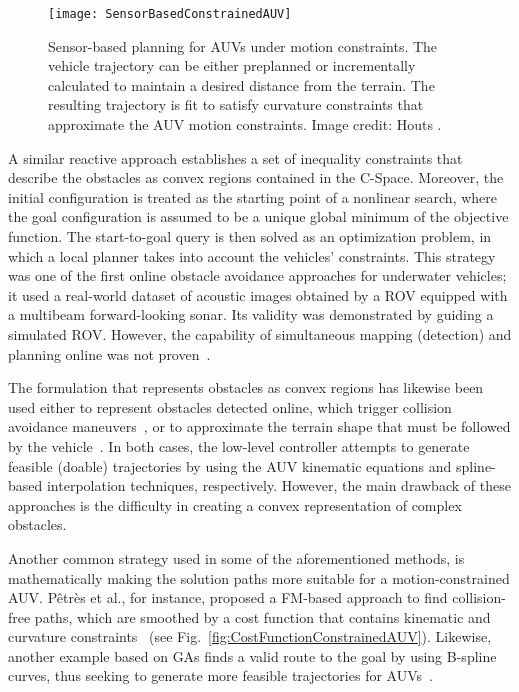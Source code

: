 \begin{figure}[htbp]
    \myfloatalign
    \texttt{[image: SensorBasedConstrainedAUV]}
\caption[Sensor-based planning for AUVs under motion constraints.]
{Sensor-based planning for AUVs under motion constraints. The vehicle trajectory
can be either preplanned or incrementally calculated to maintain a desired
distance from the terrain. The resulting trajectory is fit to satisfy
curvature constraints that approximate the AUV motion constraints. Image credit:
Houts \etal\cite{Houts2012,Houts2014}.}
\label{fig:SensorBasedConstrainedAUV}
\end{figure}

A similar reactive approach establishes a set of inequality constraints that
describe the obstacles as convex regions contained in the \ac{C-Space}.
Moreover, the initial configuration is treated as the starting point of a
nonlinear search, where the goal configuration is assumed to be a unique global
minimum of the objective function. The start-to-goal query is then solved as an
optimization problem, in which a local planner takes into account the vehicles'
constraints. This strategy was one of the first online obstacle avoidance
approaches for underwater vehicles; it used a real-world dataset of acoustic
images obtained by a \ac{ROV} equipped with a multibeam forward-looking sonar.
Its validity was demonstrated by guiding a simulated \ac{ROV}. However, the
capability of simultaneous mapping (detection) and planning online was not
proven~\cite{Petillot2001}.

The formulation that represents obstacles as convex regions has likewise been
used either to represent obstacles detected online, which trigger collision
avoidance maneuvers~\cite{Qu2009}, or to approximate the terrain shape that must
be followed by the vehicle~\cite{Murthy2010}. In both cases, the low-level
controller attempts to generate feasible (doable) trajectories by using the
\ac{AUV} kinematic equations and spline-based interpolation techniques,
respectively. However, the main drawback of these approaches is the difficulty
in creating a convex representation of complex obstacles.

Another common strategy used in some of the aforementioned methods, is
mathematically making the solution paths more suitable for a motion-constrained
\ac{AUV}. Pêtrès et al., for instance, proposed a \ac{FM}-based approach to find
collision-free paths, which are smoothed by a cost function that contains
kinematic and curvature constraints~\cite{Petres2007} (see
Fig.~\ref{fig:CostFunctionConstrainedAUV}). Likewise, another example based on
\acp{GA} finds a valid route to the goal by using \ac{B-spline} curves, thus
seeking to generate more feasible trajectories for \acp{AUV}~\cite{Cheng2010}.



